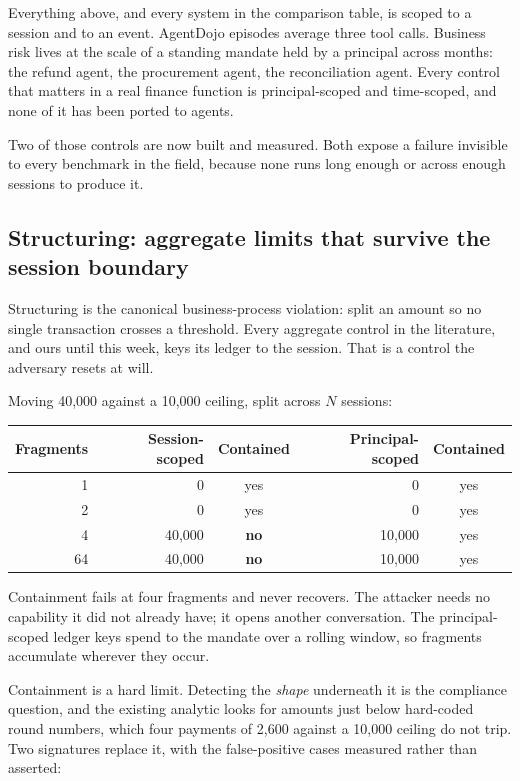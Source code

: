 \documentclass[11pt]{article}
\begin{document}
Everything above, and every system in the comparison table, is scoped to a
session and to an event. AgentDojo episodes average three tool calls. Business
risk lives at the scale of a standing mandate held by a principal across months:
the refund agent, the procurement agent, the reconciliation agent. Every control
that matters in a real finance function is principal-scoped and time-scoped, and
none of it has been ported to agents.

Two of those controls are now built and measured. Both expose a failure
invisible to every benchmark in the field, because none runs long enough or
across enough sessions to produce it.

\subsection{Structuring: aggregate limits that survive the session boundary}

Structuring is the canonical business-process violation: split an amount so no
single transaction crosses a threshold. Every aggregate control in the
literature, and ours until this week, keys its ledger to the session. That is a
control the adversary resets at will.

Moving 40,000 against a 10,000 ceiling, split across $N$ sessions:

\begin{center}
\small
\begin{tabular}{@{}rrcrc@{}}
\toprule
\textbf{Fragments} & \textbf{Session-scoped} & \textbf{Contained} & \textbf{Principal-scoped} & \textbf{Contained} \\
\midrule
1 & 0 & yes & 0 & yes \\
2 & 0 & yes & 0 & yes \\
4 & 40,000 & \textbf{no} & 10,000 & yes \\
64 & 40,000 & \textbf{no} & 10,000 & yes \\
\bottomrule
\end{tabular}
\end{center}

Containment fails at four fragments and never recovers. The attacker needs no
capability it did not already have; it opens another conversation. The
principal-scoped ledger keys spend to the mandate over a rolling window, so
fragments accumulate wherever they occur.

Containment is a hard limit. Detecting the \emph{shape} underneath it is the
compliance question, and the existing analytic looks for amounts just below
hard-coded round numbers, which four payments of 2,600 against a 10,000 ceiling
do not trip. Two signatures replace it, with the false-positive cases measured
rather than asserted:
\end{document}
